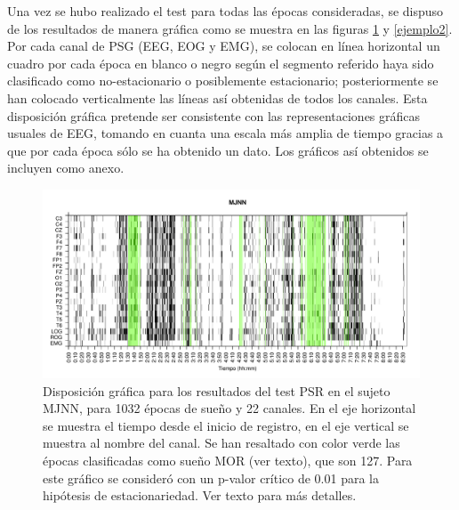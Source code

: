 Una vez se hubo realizado el test para todas las \'epocas consideradas, se dispuso de los 
resultados de manera gr\'afica  como se muestra en las figuras \ref{ejemplo1} y \ref{ejemplo2}.
Por cada canal de PSG (EEG, EOG y EMG), se colocan en l\'inea horizontal un cuadro por cada
\'epoca en blanco o negro seg\'un el segmento referido haya sido clasificado como
no-estacionario o posiblemente estacionario; posteriormente se han colocado verticalmente las
l\'ineas as\'i obtenidas de todos los canales.
Esta disposici\'on gr\'afica pretende ser consistente con las representaciones gr\'aficas
usuales de EEG, tomando en cuanta una escala m\'as amplia de tiempo gracias a que por
cada \'epoca s\'olo se ha obtenido un dato.
Los gr\'aficos as\'i obtenidos se incluyen como anexo.

\begin{figure}
\includegraphics[width=\textwidth]{MJNNVIGILOS_127_mor127_tot1032_esttotal.pdf} 
\caption{Disposici\'on gr\'afica para los resultados del test PSR en el sujeto MJNN, 
para 1032 \'epocas de sue\~no y 22 canales. 
En el eje horizontal se muestra el tiempo desde el inicio de registro, en el eje vertical se muestra al 
nombre del canal. 
Se han resaltado con color verde las \'epocas clasificadas como sue\~no MOR (ver texto), que son 127.
Para este gr\'afico se consider\'o con un p-valor cr\'itico de 0.01 para la hip\'otesis
de estacionariedad. Ver texto para m\'as detalles.}
\label{ejemplo1}
\end{figure}


